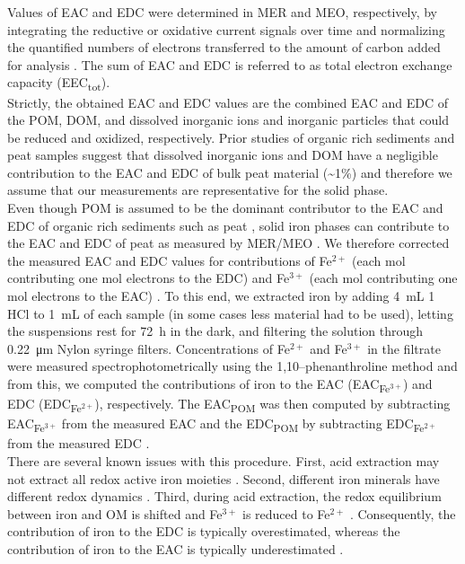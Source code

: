 \documentclass[alpha-refs]{wiley-article-rmd}
\begin{document}
\begin{refsection}
Values of EAC and EDC were determined in MER and MEO, respectively, by integrating the reductive or oxidative current signals over time and normalizing the quantified numbers of electrons transferred to the amount of carbon added for analysis \autocite{Aeschbacher.2010}. The sum of EAC and EDC is referred to as total electron exchange capacity (EEC\textsubscript{tot}).\\
Strictly, the obtained EAC and EDC values are the combined EAC and EDC of the POM, DOM, and dissolved inorganic ions and inorganic particles that could be reduced and oxidized, respectively. Prior studies of organic rich sediments and peat samples suggest that dissolved inorganic ions and DOM have a negligible contribution to the EAC and EDC of bulk peat material (\textasciitilde1\%) \autocite{Lau.2015,Gao.2019} and therefore we assume that our measurements are representative for the solid phase.\\
Even though POM is assumed to be the dominant contributor to the EAC and EDC of organic rich sediments such as peat \autocite{Lau.2015,Gao.2019}, solid iron phases can contribute to the EAC and EDC of peat as measured by MER/MEO \autocite{Lau.2015}. We therefore corrected the measured EAC and EDC values for contributions of Fe\(^{2+}\) (each mol contributing one mol electrons to the EDC) and Fe\(^{3+}\) (each mol contributing one mol electrons to the EAC) \autocite{Lau.2015,Gao.2019}. To this end, we extracted iron by adding \SI{4}{\milli\liter} \SI{1}{\Molar} HCl to \SI{1}{\milli\liter} of each sample (in some cases less material had to be used), letting the suspensions rest for \SI{72}{\hour} in the dark, and filtering the solution through \SI{0.22}{\micro\meter} Nylon syringe filters. Concentrations of Fe\(^{2+}\) and Fe\(^{3+}\) in the filtrate were measured spectrophotometrically using the 1,10--phenanthroline method \autocite{Tamura.1974} and from this, we computed the contributions of iron to the EAC (EAC\textsubscript{Fe$^{3+}$}) and EDC (EDC\textsubscript{Fe$^{2+}$}), respectively. The EAC\textsubscript{POM} was then computed by subtracting EAC\textsubscript{Fe$^{3+}$} from the measured EAC and the EDC\textsubscript{POM} by subtracting EDC\textsubscript{Fe$^{2+}$} from the measured EDC \autocite{Lau.2015}.\\
There are several known issues with this procedure. First, acid extraction may not extract all redox active iron moieties \autocite{Lau.2016}. Second, different iron minerals have different redox dynamics \autocite{Aeppli.2018}. Third, during acid extraction, the redox equilibrium between iron and OM is shifted and Fe\(^{3+}\) is reduced to Fe\(^{2+}\) \autocite{Lau.2015}. Consequently, the contribution of iron to the EDC is typically overestimated, whereas the contribution of iron to the EAC is typically underestimated \autocite{Lau.2015}.\\

\end{refsection}
\end{document}
